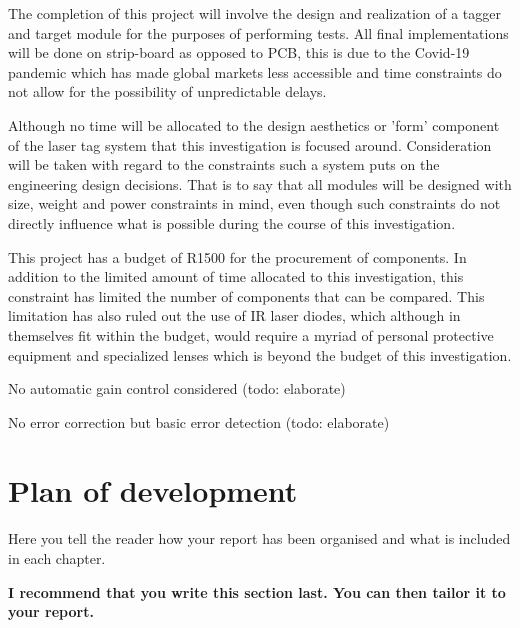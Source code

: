The completion of this project will involve the design and realization of a tagger and target module for the purposes of performing tests. All final implementations will be done on strip-board as opposed to PCB, this is due to the Covid-19 pandemic which has made global markets less accessible and time constraints do not allow for the possibility of unpredictable delays.

Although no time will be allocated to the design aesthetics or 'form' component of the laser tag system that this investigation is focused around. Consideration will be taken with regard to the constraints such a system puts on the engineering design decisions. That is to say that all modules will be designed with size, weight and power constraints in mind, even though such constraints do not directly influence what is possible during the course of this investigation.

This project has a budget of R1500 for the procurement of components. In addition to the limited amount of time allocated to this investigation, this constraint has limited the number of components that can be compared. This limitation has also ruled out the use of IR laser diodes, which although in themselves fit within the budget, would require a myriad of personal protective equipment and specialized lenses which is beyond the budget of this investigation.

No automatic gain control considered (todo: elaborate)

No error correction but basic error detection (todo: elaborate)





\section{Plan of development}
Here you tell the reader how your report has been organised and what is included in each
chapter.

{\bf I recommend that you write this section last. You can then tailor it to your report.}
